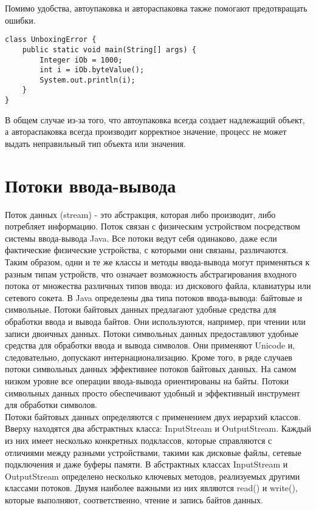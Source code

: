 Помимо удобства, автоупаковка и автораспаковка также помогают предотвращать ошибки. 
\begin{lstlisting}
class UnboxingError {
    public static void main(String[] args) {
        Integer iOb = 1000;
        int i = iOb.byteValue(); 
        System.out.println(i); 
    }
}
\end{lstlisting}
В общем случае из-за того, что автоупаковка всегда создает надлежащий объект, а автораспаковка всегда производит корректное значение, процесс не может выдать неправильный тип объекта или значения. \\

\section{Потоки ввода-вывода}
\noindent Поток данных (stream) - это абстракция, которая либо производит, либо потребляет информацию. Поток связан с физическим устройством посредством системы ввода-вывода Java. Все потоки ведут себя одинаково, даже если фактические физические устройства, с которыми они связаны, различаются. Таким образом, одни и те же классы и методы ввода-вывода могут применяться к разным типам устройств, что означает возможность абстрагирования входного потока от множества различных типов ввода: из дискового файла, клавиатуры или сетевого сокета. В Java определены два типа потоков ввода-вывода: байтовые и символьные. Потоки байтовых данных предлагают удобные средства для обработки ввода и вывода байтов. Они используются, например, при чтении или записи двоичных данных. Потоки символьных данных предоставляют удобные средства для обработки ввода и вывода символов. Они применяют Unicode и, следовательно, допускают интернационализацию. Кроме того, в ряде случаев потоки символьных данных эффективнее потоков байтовых данных. На самом низком уровне все операции ввода-вывода ориентированы на байты. Потоки символьных данных просто обеспечивают удобный и эффективный инструмент для обработки символов. \\
Потоки байтовых данных определяются с применением двух иерархий классов. Вверху находятся два абстрактных класса: InputStream и OutputStream. Каждый из них имеет несколько конкретных подклассов, которые справляются с отличиями между разными устройствами, такими как дисковые файлы, сетевые подключения и даже буферы памяти. В абстрактных классах InputStream и OutputStream определено несколько ключевых методов, реализуемых другими классами потоков. Двумя наиболее важными из них являются read() и write(), которые выполняют, соответственно, чтение и запись байтов данных. \\
